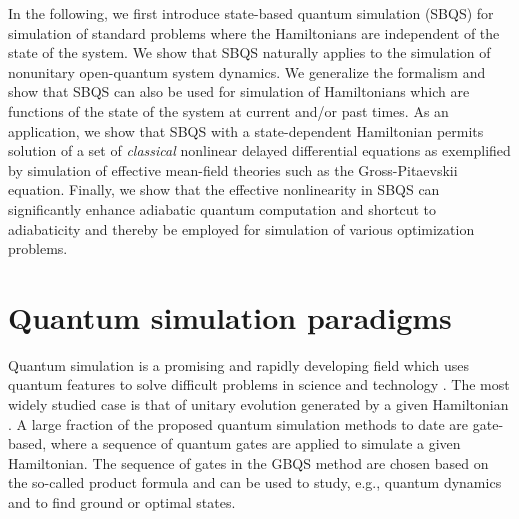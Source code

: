 \documentclass[aps,pra,twocolumn,floatfix,groupedaddress,superscriptaddress,nofootinbib,notitlepage]{revtex4-2}
\begin{document}
In the following, we first introduce state-based quantum simulation (SBQS) for simulation of standard problems where the Hamiltonians are independent of the state of the system. We show that SBQS naturally applies to the simulation of nonunitary open-quantum system dynamics. We generalize the formalism and show that SBQS can also be used for simulation of Hamiltonians which are functions of the state of the system at current and/or past times. As an application, we show that SBQS with a state-dependent Hamiltonian permits solution of a set of \textit{classical} nonlinear delayed differential equations as exemplified by simulation of effective mean-field theories such as the Gross-Pitaevskii equation. Finally, we show that the effective nonlinearity in SBQS can significantly enhance adiabatic quantum computation and shortcut to adiabaticity and thereby be employed for simulation of various optimization problems.

\section{Quantum simulation paradigms}
\label{sec:QSim}

Quantum simulation \cite{Feynman} is a promising and rapidly developing field which uses quantum features to solve difficult problems in science and technology \cite{Lloyd:UQS, Aspuru, qsim-entropy, Nori, Preskill, QS-exp}. The most widely studied case is that of unitary evolution generated by a given Hamiltonian \cite{HHL, LinCombUnitaries, Poulin:TimeDepH, QHSBenchmark, QHS4NearTermHarware}. A large fraction of the proposed quantum simulation methods to date are gate-based, where a sequence of quantum gates are applied to simulate a given Hamiltonian. The sequence of gates in the GBQS method are chosen based on the so-called product formula \cite{QA4HS, ProductFormula} and can be used to study, e.g., quantum dynamics and to find ground or optimal states.  
\end{document}
